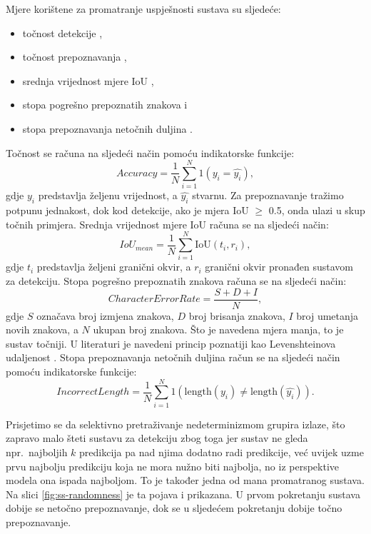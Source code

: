 \documentclass[times, utf8, diplomski]{fer}
\begin{document}
Mjere korištene za promatranje uspješnosti sustava su sljedeće:
\begin{itemize}
    \item točnost detekcije ,
    \item točnost prepoznavanja ,
    \item srednja vrijednost mjere IoU ,
    \item stopa pogrešno prepoznatih znakova  i
    \item stopa prepoznavanja netočnih duljina .
\end{itemize}
Točnost se računa na sljedeći način pomoću indikatorske funkcije:
\begin{equation}
    Accuracy = \frac{1}{N}\sum_{i=1}^{N}1(y_i=\hat{y_i}),
\end{equation}
gdje $y_i$ predstavlja željenu vrijednost, a $\hat{y_i}$ stvarnu. Za prepoznavanje tražimo potpunu jednakost, dok kod detekcije, ako je mjera IoU $\geq$ 0.5, onda ulazi u skup točnih primjera.
Srednja vrijednost mjere IoU računa se na sljedeći način:
\begin{equation}
    IoU_{mean} = \frac{1}{N}\sum_{i=1}^{N}\text{IoU}(t_i, r_i),
\end{equation}
gdje $t_i$ predstavlja željeni granični okvir, a $r_i$ granični okvir pronađen sustavom za detekciju.
Stopa pogrešno prepoznatih znakova računa se na sljedeći način:
\begin{equation}
    Character Error Rate = \frac{S+D+I}{N},
\end{equation}
gdje $S$ označava broj izmjena  znakova, $D$ broj brisanja  znakova, $I$ broj umetanja  novih znakova, a $N$ ukupan broj znakova. Što je navedena mjera manja, to je sustav točniji. U literaturi je navedeni princip poznatiji kao Levenshteinova udaljenost .
Stopa prepoznavanja netočnih duljina račun se na sljedeći način pomoću indikatorske funkcije:
\begin{equation}
    Incorrect Length = \frac{1}{N}\sum_{i=1}^{N}1(\text{length}(y_i)\ne\text{length}(\hat{y_i})).
\end{equation}

Prisjetimo se da selektivno pretraživanje nedeterminizmom grupira izlaze, što zapravo malo šteti sustavu za detekciju zbog toga jer sustav ne gleda npr.\ najboljih $k$ predikcija pa nad njima dodatno radi predikcije, već uvijek uzme prvu najbolju predikciju koja ne mora nužno biti najbolja, no iz perspektive modela ona ispada najboljom. To je također jedna od mana promatranog sustava. Na slici \ref{fig:ss-randomness} je ta pojava i prikazana. U prvom pokretanju sustava dobije se netočno prepoznavanje, dok se u sljedećem pokretanju dobije točno prepoznavanje.
\end{document}
